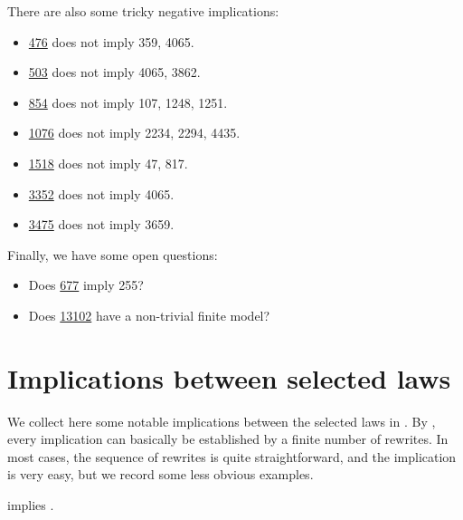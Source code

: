 There are also some tricky negative implications:
\begin{itemize}
\item \href{https://teorth.github.io/equational_theories/implications/?476}{476} does not imply 359, 4065.
\item \href{https://teorth.github.io/equational_theories/implications/?503}{503} does not imply 4065, 3862.
\item \href{https://teorth.github.io/equational_theories/implications/?854}{854} does not imply 107, 1248, 1251.
\item \href{https://teorth.github.io/equational_theories/implications/?1076}{1076} does not imply 2234, 2294, 4435.
\item \href{https://teorth.github.io/equational_theories/implications/?1518}{1518} does not imply 47, 817.
\item \href{https://teorth.github.io/equational_theories/implications/?3352}{3352} does not imply 4065.
\item \href{https://teorth.github.io/equational_theories/implications/?3475}{3475} does not imply 3659.
\end{itemize}

Finally, we have some open questions:
\begin{itemize}
\item Does \href{https://teorth.github.io/equational_theories/implications/?677}{677} imply 255?
\item Does \href{https://teorth.github.io/equational_theories/implications/?13102}{13102} have a non-trivial finite model?
\end{itemize}


\chapter{Implications between selected laws}\label{implications-chapter}

We collect here some notable implications between the selected laws in .   By , every implication can basically be established by a finite number of rewrites.  In most cases, the sequence of rewrites is quite straightforward, and the implication is very easy, but we record some less obvious examples.

\begin{theorem}[387 implies 43]\label{387_implies_43}\leanok  {} implies .
\end{theorem}


